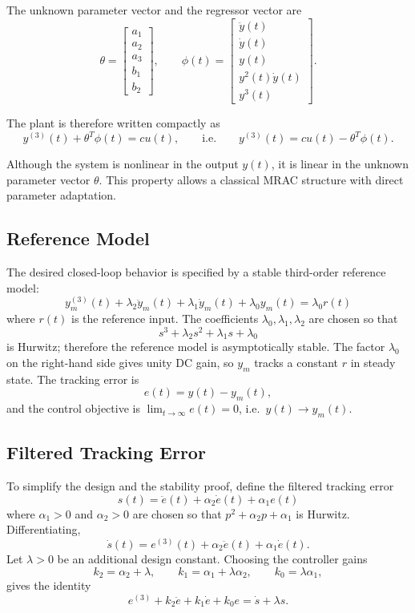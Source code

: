 \documentclass[12pt]{article}
\begin{document}
\noindent The unknown parameter vector and the regressor vector are
\[
\theta=
\begin{bmatrix}
a_1\\ a_2\\ a_3\\ b_1\\ b_2
\end{bmatrix},
\qquad
\phi(t)=
\begin{bmatrix}
\ddot{y}(t)\\ \dot{y}(t)\\ y(t)\\ y^2(t)\dot{y}(t)\\ y^3(t)
\end{bmatrix}.
\]

\noindent The plant is therefore written compactly as
\[
y^{(3)}(t)+\theta^T\phi(t)=cu(t),
\qquad\text{i.e.}\qquad
y^{(3)}(t)=cu(t)-\theta^T\phi(t).
\]

\noindent Although the system is nonlinear in the output \(y(t)\), it is linear in the unknown parameter vector \(\theta\). This property allows a classical MRAC structure with direct parameter adaptation.

\subsection{Reference Model}

\noindent The desired closed-loop behavior is specified by a stable third-order reference model:
\[
\boxed{
y_m^{(3)}(t)
+
\lambda_2\ddot{y}_m(t)
+
\lambda_1\dot{y}_m(t)
+
\lambda_0y_m(t)
=
\lambda_0r(t)
}
\]
\noindent where \(r(t)\) is the reference input. The coefficients \(\lambda_0,\lambda_1,\lambda_2\) are chosen so that
\[
s^3+\lambda_2s^2+\lambda_1s+\lambda_0
\]
\noindent is Hurwitz; therefore the reference model is asymptotically stable. The factor \(\lambda_0\) on the right-hand side gives unity DC gain, so \(y_m\) tracks a constant \(r\) in steady state. The tracking error is
\[
e(t)=y(t)-y_m(t),
\]
\noindent and the control objective is \(\lim_{t\to\infty} e(t)=0\), i.e.\ \(y(t)\rightarrow y_m(t)\).

\subsection{Filtered Tracking Error}

\noindent To simplify the design and the stability proof, define the filtered tracking error
\[
\boxed{
s(t)=\ddot{e}(t)+\alpha_2\dot{e}(t)+\alpha_1e(t)
}
\]
\noindent where \(\alpha_1>0\) and \(\alpha_2>0\) are chosen so that \(p^2+\alpha_2p+\alpha_1\) is Hurwitz. Differentiating,
\[
\dot{s}(t)=e^{(3)}(t)+\alpha_2\ddot{e}(t)+\alpha_1\dot{e}(t).
\]
\noindent Let \(\lambda>0\) be an additional design constant. Choosing the controller gains
\[
k_2=\alpha_2+\lambda,
\qquad
k_1=\alpha_1+\lambda\alpha_2,
\qquad
k_0=\lambda\alpha_1,
\]
\noindent gives the identity
\[
e^{(3)}+k_2\ddot{e}+k_1\dot{e}+k_0e
=
\dot{s}+\lambda s.
\]
\end{document}
